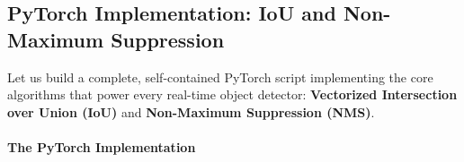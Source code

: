 \subsection{PyTorch Implementation: IoU and Non-Maximum Suppression}\label{subsec:pytorch_nms}

Let us build a complete, self-contained PyTorch script implementing the core algorithms that power every real-time object detector: \textbf{Vectorized Intersection over Union (IoU)} and \textbf{Non-Maximum Suppression (NMS)}.

\paragraph{The PyTorch Implementation}

